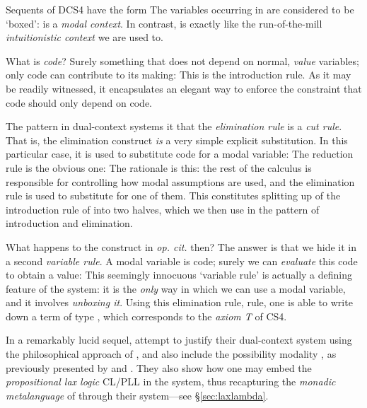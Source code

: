 \documentclass[a4paper]{amsart}
\begin{document}
Sequents of \textsf{DCS4} have the form  The variables occurring in  are considered to be
`boxed':  is a \emph{modal context}. In contrast,
 is exactly like the run-of-the-mill \emph{intuitionistic
context} we are used to. 

What is \emph{code}? Surely something that does not depend on
normal, \emph{value} variables; only code can contribute to its
making:  This is the introduction rule. As it may be
readily witnessed, it encapsulates an elegant way to enforce the
constraint that code should only depend on code.

The pattern in dual-context systems it that the \emph{elimination
rule} is a \emph{cut rule}. That is, the elimination construct
\emph{is} a very simple explicit substitution. In this particular
case,  it is used to substitute code for a modal variable:  The reduction rule is the obvious one:  The rationale is this: the rest of the calculus is responsible
for controlling how modal assumptions are used, and the
elimination rule is used to substitute for one of them. This
constitutes splitting up of the introduction rule of
\cite{Bierman2000a} into two halves, which we then use in the
pattern of introduction and elimination.

What happens to the  construct in \emph{op. cit.}
then? The answer is that we hide it in a second \emph{variable
rule}. A modal variable is code; surely we can \emph{evaluate}
this code to obtain a value:  This seemingly innocuous `variable rule' is actually a defining
feature of the system: it is the \emph{only} way in which
we can use a modal variable, and it involves \emph{unboxing it}.
Using this elimination rule, rule, one is able to write down a
term of type , which corresponds to the
\emph{axiom T} of \textsf{CS4}.

In a remarkably lucid sequel, \cite{Davies2001} attempt to justify
their dual-context system using the philosophical approach of
\cite{Martin-Lof1996}, and also include the possibility modality
, as previously presented by \cite{Bierman2000a} and
\cite{Kobayashi1997}. They also show how one may embed the
\emph{propositional lax logic} \textsf{CL/PLL} in the system, thus
recapturing the \emph{monadic metalanguage} of \cite{Moggi1991}
through their system---see \S \ref{sec:laxlambda}.
\end{document}
